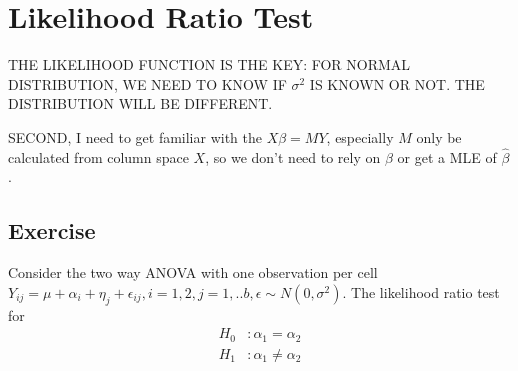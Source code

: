 \section{Likelihood Ratio Test}

THE LIKELIHOOD FUNCTION IS THE KEY:
FOR NORMAL DISTRIBUTION, WE NEED TO KNOW IF $\sigma^2$ IS KNOWN OR NOT. THE DISTRIBUTION WILL BE DIFFERENT.

SECOND, I need to get familiar with the $X\beta = MY$, especially $M$ only be calculated from column space $X$, so we don't need to rely on $\beta$ or get a MLE of $\hat{\beta}$.



\subsection{Exercise}

 Consider the two way ANOVA with one observation per cell $Y_{ij} = \mu + \alpha_i + \eta_j + \epsilon_{ij}, i=1,2, j=1,..b, \epsilon \sim N(0, \sigma^2)$. 
 The likelihood ratio test for 
 \begin{align*}
 H_0 &: \alpha_1 = \alpha_2 \\
 H_1 &: \alpha_1 \neq \alpha_2
 \end{align*}
 
